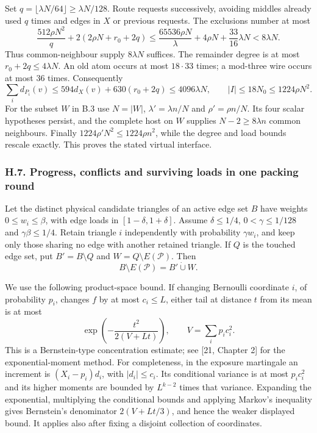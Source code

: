 \documentclass[english,11pt,a4paper]{article}
\begin{document}
Set \(q=\lfloor\lambda N/64\rfloor\ge\lambda N/128\). Route requests successively, avoiding middles already used \(q\) times and edges in \(X\) or previous requests. The exclusions number at most \[\frac{512\rho N^2}{q}+2(2\rho N+r_0+2q)
\le\frac{65536\rho N}{\lambda}+4\rho N+\frac{33}{16}\lambda N
<8\lambda N.\] Thus common-neighbour supply \(8\lambda N\) suffices. The remainder degree is at most \(r_0+2q\le4\lambda N\). An old atom occurs at most \(18\cdot33\) times; a mod-three wire occurs at most \(36\) times. Consequently \[\sum_i d_{P_i}(v)\le594d_X(v)+630(r_0+2q)\le4096\lambda N,
\qquad |I|\le18N_0\le1224\rho N^2.\] For the subset \(W\) in B.3 use \(N=|W|\), \(\lambda'=\lambda n/N\) and \(\rho'=\rho n/N\). Its four scalar hypotheses persist, and the complete host on \(W\) supplies \(N-2\ge8\lambda n\) common neighbours. Finally \(1224\rho'N^2\le1224\rho n^2\), while the degree and load bounds rescale exactly. This proves the stated virtual interface.

\subsubsection{H.7. Progress, conflicts and surviving loads in one packing round}\label{h.7.-progress-conflicts-and-surviving-loads-in-one-packing-round}

Let the distinct physical candidate triangles of an active edge set \(B\) have weights \(0\le w_i\le\beta\), with edge loads in \([1-\delta,1+\delta]\). Assume \(\delta\le1/4\), \(0<\gamma\le1/128\) and \(\gamma\beta\le1/4\). Retain triangle \(i\) independently with probability \(\gamma w_i\), and keep only those sharing no edge with another retained triangle. If \(Q\) is the touched edge set, put \(B'=B\setminus Q\) and \(W=Q\setminus E(\mathcal P)\). Then \[B\setminus E(\mathcal P)=B'\mathbin{\dot\cup}W.\]

We use the following product-space bound. If changing Bernoulli coordinate \(i\), of probability \(p_i\), changes \(f\) by at most \(c_i\le L\), either tail at distance \(t\) from its mean is at most \[\exp\left(-\frac{t^2}{2(V+Lt)}\right),\qquad V=\sum_i p_ic_i^2.\] This is a Bernstein-type concentration estimate; see {[}21, Chapter 2{]} for the exponential-moment method. For completeness, in the exposure martingale an increment is \((X_i-p_i)d_i\), with \(|d_i|\le c_i\). Its conditional variance is at most \(p_ic_i^2\) and its higher moments are bounded by \(L^{k-2}\) times that variance. Expanding the exponential, multiplying the conditional bounds and applying Markov's inequality gives Bernstein's denominator \(2(V+Lt/3)\), and hence the weaker displayed bound. It applies also after fixing a disjoint collection of coordinates.
\end{document}
